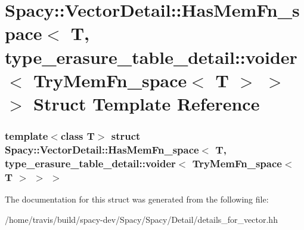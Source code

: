 \hypertarget{structSpacy_1_1VectorDetail_1_1HasMemFn__space_3_01T_00_01type__erasure__table__detail_1_1voidera2c97b5927b33b26d45a364aab68887f}{\section{\-Spacy\-:\-:\-Vector\-Detail\-:\-:\-Has\-Mem\-Fn\-\_\-space$<$ \-T, type\-\_\-erasure\-\_\-table\-\_\-detail\-:\-:voider$<$ \-Try\-Mem\-Fn\-\_\-space$<$ \-T $>$ $>$ $>$ \-Struct \-Template \-Reference}
\label{structSpacy_1_1VectorDetail_1_1HasMemFn__space_3_01T_00_01type__erasure__table__detail_1_1voidera2c97b5927b33b26d45a364aab68887f}
}
\subsubsection*{template$<$class T$>$ struct Spacy\-::\-Vector\-Detail\-::\-Has\-Mem\-Fn\-\_\-space$<$ T, type\-\_\-erasure\-\_\-table\-\_\-detail\-::voider$<$ Try\-Mem\-Fn\-\_\-space$<$ T $>$ $>$ $>$}



\-The documentation for this struct was generated from the following file\-:\begin{DoxyCompactItemize}
\item 
/home/travis/build/spacy-\/dev/\-Spacy/\-Spacy/\-Detail/details\-\_\-for\-\_\-vector.\-hh\end{DoxyCompactItemize}
